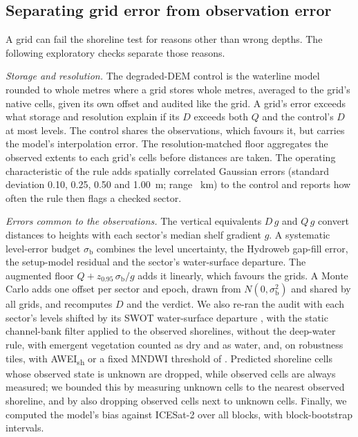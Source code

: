 \subsection{Separating grid error from observation error}
\label{sec:sep}
A grid can fail the shoreline test for reasons other than wrong depths. The following exploratory checks separate those reasons.

\textit{Storage and resolution.} The degraded-DEM control is the waterline model rounded to whole metres where a grid stores whole metres, averaged to the grid's native cells, given its own offset and audited like the grid. A grid's error exceeds what storage and resolution explain if its $D$ exceeds both $Q$ and the control's $D$ at most levels. The control shares the observations, which favours it, but carries the model's interpolation error. The resolution-matched floor aggregates the observed extents to each grid's cells before distances are taken. The operating characteristic of the rule adds spatially correlated Gaussian errors (standard deviation 0.10, 0.25, 0.50 and 1.00~m; range ~km) to the control and reports how often the rule then flags a checked sector.

\textit{Errors common to the observations.} The vertical equivalents $D\,g$ and $Q\,g$ convert distances to heights with each sector's median shelf gradient $g$. A systematic level-error budget $\sigma_{\mathrm{b}}$ combines the level uncertainty, the Hydroweb gap-fill error, the setup-model residual and the sector's water-surface departure. The augmented floor $Q + z_{0.95}\,\sigma_{\mathrm{b}}/g$ adds it linearly, which favours the grids. A Monte Carlo adds one offset per sector and epoch, drawn from $N(0, \sigma_{\mathrm{b}}^2)$ and shared by all grids, and recomputes $D$ and the verdict. We also re-ran the audit with each sector's levels shifted by its SWOT water-surface departure \citep{swot_raster_d,swot_raster_c,swot_pdd_raster}, with the static channel-bank filter applied to the observed shorelines, without the deep-water rule, with emergent vegetation counted as dry and as water, and, on robustness tiles, with AWEI\textsubscript{sh} \citep{feyisa2014} or a fixed MNDWI threshold of . Predicted shoreline cells whose observed state is unknown are dropped, while observed cells are always measured; we bounded this by measuring unknown cells to the nearest observed shoreline, and by also dropping observed cells next to unknown cells. Finally, we computed the model's bias against ICESat-2 over all blocks, with block-bootstrap intervals.

